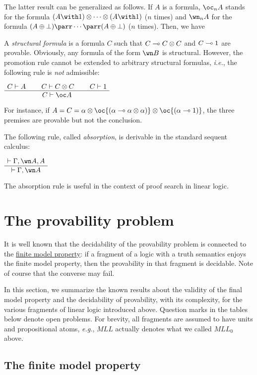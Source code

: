The latter result can be generalized as follows. If \(A\) is a formula,
\(\oc_nA\) stands for the formula
\((A\with\one)\tens\cdots\tens(A\with\one)\) (\(n\) times) and
\(\wn_nA\) for the formula \((A\plus\bot)\parr\cdots\parr(A\plus\bot)\)
(\(n\) times). Then, we have

A \emph{structural formula} is a formula \(C\) such that
\(C\multimap C\otimes C\) and \(C\multimap1\) are provable. Obviously, any
formula of the form \(\wn B\) is structural. However, the promotion rule
cannot be extended to arbitrary structural formulas, \emph{i.e.}, the
following rule is \emph{not} admissible:

\(\AxRule{C\vdash A}
\AxRule{C\vdash C\tens C}
\AxRule{C\vdash\one}
\TriRule{C\vdash\oc A}
\DisplayProof\)

For instance, if
\(A=C=\alpha\tens\oc{(\alpha\limp\alpha\tens\alpha)}\tens\oc{(\alpha\limp\one)}\),
the three premises are provable but not the conclusion.

The following rule, called \emph{absorption}, is derivable in the
standard sequent calculus:

\(\AxRule{\vdash\Gamma,\wn A,A}
\UnaRule{\vdash\Gamma,\wn A}
\DisplayProof\)

The absorption rule is useful in the context of proof search in linear
logic.

\section{The provability problem}\label{the-provability-problem}

It is well known that the decidability of the provability problem is
connected to the \href{Phase_semantics}{finite model property}: if a
fragment of a logic with a truth semantics enjoys the finite model
property, then the provability in that fragment is decidable. Note of
course that the converse may fail.

In this section, we summarize the known results about the validity of
the final model property and the decidability of provability, with its
complexity, for the various fragments of linear logic introduced above.
Question marks in the tables below denote open problems. For brevity,
all fragments are assumed to have units and propositional atoms,
\emph{e.g.}, \(MLL\) actually denotes what we called \(MLL_0\) above.

\subsection{The finite model
property}\label{the-finite-model-property}

